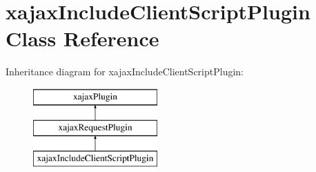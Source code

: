 \hypertarget{classxajaxIncludeClientScriptPlugin}{
\section{xajaxIncludeClientScriptPlugin Class Reference}
\label{classxajaxIncludeClientScriptPlugin}
}
Inheritance diagram for xajaxIncludeClientScriptPlugin:\begin{figure}[H]
\begin{center}
\leavevmode
\includegraphics[height=3.000000cm]{classxajaxIncludeClientScriptPlugin}
\end{center}
\end{figure}
